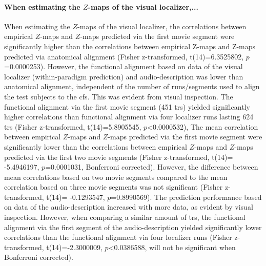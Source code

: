 \paragraph{When estimating the $Z$-maps of the visual localizer,...}
%
When estimating the $Z$-maps of the visual localizer, the correlations between
empirical $Z$-maps and $Z$-maps predicted via the first movie segment were
significantly higher than the correlations between empirical Z-maps and Z-maps
predicted via anatomical alignment (Fisher z-transformed, t(14)=6.3525802,
$p$=0.0000253).
%
However, the functional alignment based on data of the visual localizer
(within-paradigm prediction) and audio-description was lower than anatomical
alignment, independent of the number of runs/segments used to align the test
subjects to the \ac{cfs}. This was evident from visual inspection.
%
The functional alignment via the first movie segment (451 \acp{tr}) yielded
significantly higher correlations than functional alignment via four localizer
runs lasting 624 \acp{tr} (Fisher z-transformed, t(14)=5.8905545,
$p$<0.0000532),
%
The mean correlation between empirical $Z$-maps and $Z$-maps predicted via the
first movie segment were significantly lower than the correlations between
empirical $Z$-maps and $Z$-maps predicted via the first two movie segments
(Fisher z-transformed, t(14)= -5.4946197, $p$=0.0001031, Bonferroni corrected).
%
However, the difference between mean correlations based on two movie segments
compared to the mean correlation based on three movie segments was not
significant (Fisher z-transformed, t(14)= -0.1293547, $p$=0.8990569).
%
The prediction performance based on data of the audio-description increased with
more data, as evident by visual inspection.
%
However, when comparing a similar amount of \acp{tr}, the functional alignment
via the first segment of the audio-description yielded significantly lower
correlations than the functional alignment via four localizer runs (Fisher
z-transformed, t(14)=-2.3000009, $p$<0.0386588, will not be significant when
Bonferroni corrected).



